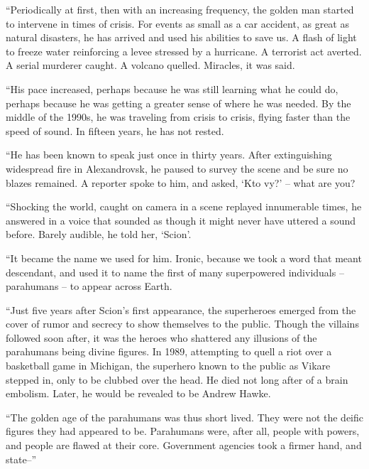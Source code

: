 ``Periodically at first, then with an increasing frequency, the golden man started to intervene in times of crisis.  For events as small as a car accident, as great as natural disasters, he has arrived and used his abilities to save us.  A flash of light to freeze water reinforcing a levee stressed by a hurricane.  A terrorist act averted.  A serial murderer caught.  A volcano quelled.  Miracles, it was said.



``His pace increased, perhaps because he was still learning what he could do, perhaps because he was getting a greater sense of where he was needed.  By the middle of the 1990s, he was traveling from crisis to crisis, flying faster than the speed of sound.  In fifteen years, he has not rested.



``He has been known to speak just once in thirty years.  After extinguishing widespread fire in Alexandrovsk, he paused to survey the scene and be sure no blazes remained.  A reporter spoke to him, and asked, `Kto vy?' – what are you?



``Shocking the world, caught on camera in a scene replayed innumerable times, he answered in a voice that sounded as though it might never have uttered a sound before.  Barely audible, he told her, `Scion'.



``It became the name we used for him.  Ironic, because we took a word that meant descendant, and used it to name the first of many superpowered individuals – parahumans – to appear across Earth.



``Just five years after Scion's first appearance, the superheroes emerged from the cover of rumor and secrecy to show themselves to the public.  Though the villains followed soon after, it was the heroes who shattered any illusions of the parahumans being divine figures.  In 1989, attempting to quell a riot over a basketball game in Michigan, the superhero known to the public as Vikare stepped in, only to be clubbed over the head.  He died not long after of a brain embolism.  Later, he would be revealed to be Andrew Hawke.



``The golden age of the parahumans was thus short lived.  They were not the deific figures they had appeared to be.  Parahumans were, after all, people with powers, and people are flawed at their core.  Government agencies took a firmer hand, and state--''



